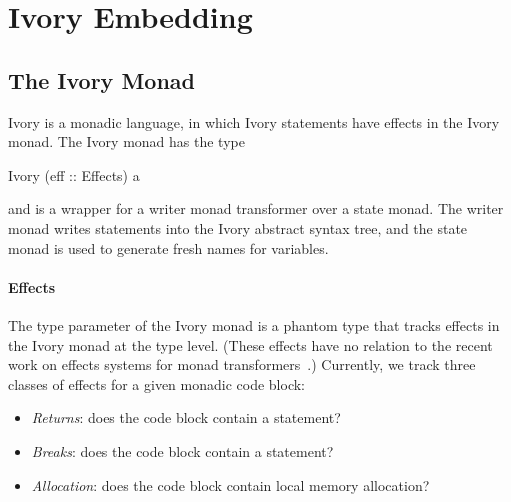 \section{Ivory Embedding}
\label{sec:ivory-embedding}


\subsection{The Ivory Monad}



Ivory is a monadic language, in which Ivory statements have effects in the Ivory
monad. The Ivory monad has the type
\begin{code}
Ivory (eff :: Effects) a
\end{code}
\noindent
and is a wrapper for a writer monad transformer over a state monad. The writer
monad writes statements into the Ivory abstract syntax tree, and the
state monad is used to generate fresh names for variables.

\paragraph{Effects}
The  type parameter of the Ivory monad is a phantom type that tracks
effects in the Ivory monad at the type level. (These effects have no relation to
the recent work on effects systems for monad transformers~\cite{}.) Currently,
we track three classes of effects for a given monadic code block:

\begin{itemize}
\item \emph{Returns}: does the code block contain a  statement?
\item \emph{Breaks}: does the code block contain a  statement?
\item \emph{Allocation}: does the code block contain local memory allocation?
\end{itemize}

